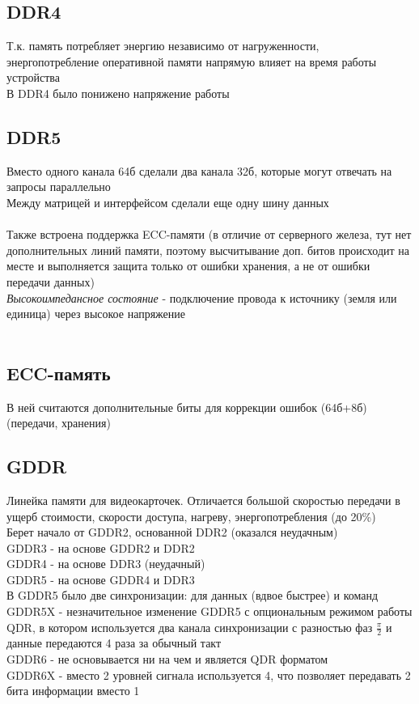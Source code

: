 \documentclass[12pt]{article}
\begin{document}
\subsection{DDR4}
Т.к. память потребляет энергию независимо от нагруженности, энергопотребление оперативной памяти напрямую влияет на время работы устройства\\
В DDR4 было понижено напряжение работы
\subsection{DDR5}
Вместо одного канала 64б сделали два канала 32б, которые могут отвечать на запросы параллельно\\
Между матрицей и интерфейсом сделали еще одну шину данных\\\\
Также встроена поддержка ECC-памяти (в отличие от серверного железа, тут нет дополнительных линий памяти, поэтому высчитывание доп. битов происходит на месте и выполняется защита только от ошибки хранения, а не от ошибки передачи данных)\\
\textit{Высокоимпедансное состояние} - подключение провода к источнику (земля или единица) через высокое напряжение\\\\
\subsection{ECC-память}
В ней считаются дополнительные биты для коррекции ошибок (64б+8б) (передачи, хранения)
\subsection{GDDR}
Линейка памяти для видеокарточек. Отличается большой скоростью передачи в ущерб стоимости, скорости доступа, нагреву, энергопотребления (до 20\%)\\
Берет начало от GDDR2, основанной DDR2 (оказался неудачным)\\
GDDR3 - на основе GDDR2 и DDR2\\
GDDR4 - на основе DDR3 (неудачный)\\
GDDR5 - на основе GDDR4 и DDR3\\
В GDDR5 было две синхронизации: для данных (вдвое быстрее) и команд\\
GDDR5X - незначительное изменение GDDR5 с опциональным режимом работы QDR, в котором используется два канала синхронизации с разностью фаз $\frac\pi2$ и данные передаются 4 раза за обычный такт\\
GDDR6 - не основывается ни на чем и является QDR форматом\\
GDDR6X - вместо 2 уровней сигнала используется 4, что позволяет передавать 2 бита информации вместо 1\\
\end{document}
